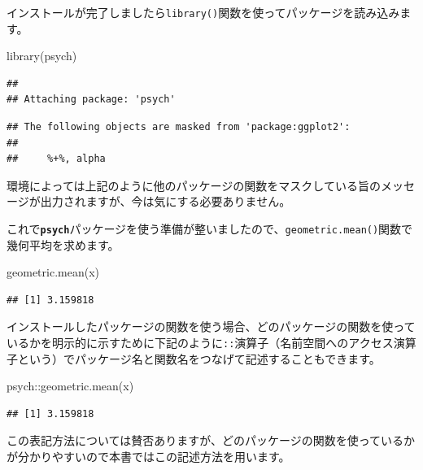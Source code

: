 \documentclass[
  12pt,
]{book}
\newenvironment{Shaded}{\begin{snugshade}}{\end{snugshade}}
\newcommand{\FunctionTok}[1]{\textcolor[rgb]{0.00,0.00,0.00}{#1}}
\newcommand{\NormalTok}[1]{#1}
\newcommand{\SpecialCharTok}[1]{\textcolor[rgb]{0.00,0.00,0.00}{#1}}
\begin{document}
インストールが完了しましたら\texttt{library()}関数を使ってパッケージを読み込みます。

\begin{Shaded}
\begin{Highlighting}[]
\FunctionTok{library}\NormalTok{(psych)}
\end{Highlighting}
\end{Shaded}

\begin{verbatim}
## 
## Attaching package: 'psych'
\end{verbatim}

\begin{verbatim}
## The following objects are masked from 'package:ggplot2':
## 
##     %+%, alpha
\end{verbatim}

環境によっては上記のように他のパッケージの関数をマスクしている旨のメッセージが出力されますが、今は気にする必要ありません。

これで\textbf{\texttt{psych}}パッケージを使う準備が整いましたので、\texttt{geometric.mean()}関数で幾何平均を求めます。

\begin{Shaded}
\begin{Highlighting}[]
\FunctionTok{geometric.mean}\NormalTok{(x)}
\end{Highlighting}
\end{Shaded}

\begin{verbatim}
## [1] 3.159818
\end{verbatim}

インストールしたパッケージの関数を使う場合、どのパッケージの関数を使っているかを明示的に示すために下記のように\texttt{::}演算子（名前空間へのアクセス演算子という）でパッケージ名と関数名をつなげて記述することもできます。

\begin{Shaded}
\begin{Highlighting}[]
\NormalTok{psych}\SpecialCharTok{::}\FunctionTok{geometric.mean}\NormalTok{(x)}
\end{Highlighting}
\end{Shaded}

\begin{verbatim}
## [1] 3.159818
\end{verbatim}

この表記方法については賛否ありますが、どのパッケージの関数を使っているかが分かりやすいので本書ではこの記述方法を用います。
\end{document}
